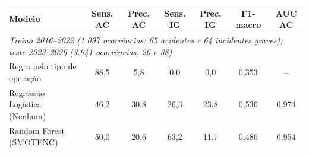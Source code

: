 \begin{tabular}{lcccccc}
\toprule
\textbf{Modelo} & \textbf{Sens. AC} & \textbf{Prec. AC} & \textbf{Sens. IG} & \textbf{Prec. IG} & \textbf{F1-macro} & \textbf{AUC AC} \\
\midrule
\multicolumn{7}{l}{\textit{Treino 2016--2022 (1.097 ocorrências: 65 acidentes e 64 incidentes graves); teste 2023--2026 (3.941 ocorrências: 26 e 38)}} \\
Regra pelo tipo de operação & 88,5 & 5,8 & 0,0 & 0,0 & 0,353 & -- \\
Regressão Logística (Nenhum) & 46,2 & 30,8 & 26,3 & 23,8 & 0,536 & 0,974 \\
Random Forest (SMOTENC) & 50,0 & 20,6 & 63,2 & 11,7 & 0,486 & 0,954 \\
\bottomrule
\end{tabular}
